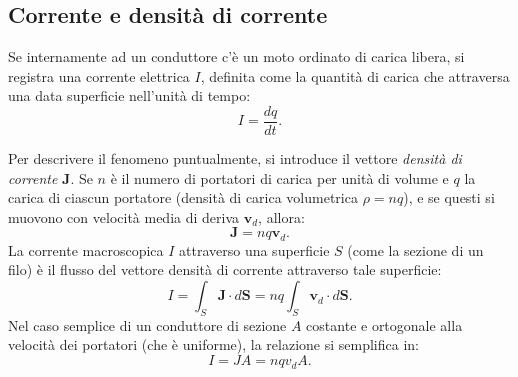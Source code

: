 \documentclass[a4paper,11pt]{report}
\begin{document}
\subsection{Corrente e densità di corrente}
Se internamente ad un conduttore c'è un moto ordinato di carica libera, si registra una corrente elettrica $I$, definita come la quantità di carica che attraversa una data superficie nell'unità di tempo:
\begin{equation}
   I = \frac{dq}{dt}.
\end{equation}

Per descrivere il fenomeno puntualmente, si introduce il vettore \textit{densità di corrente} $\bm{J}$.
Se $n$ è il numero di portatori di carica per unità di volume e $q$ la carica di ciascun portatore (densità di carica volumetrica $\rho = nq$), e se questi si muovono con velocità media di deriva $\bm{v}_d$, allora:
\begin{equation}
   \bm{J} = n q \bm{v}_d.
   \label{eq:j}
\end{equation}
La corrente macroscopica $I$ attraverso una superficie $S$ (come la sezione di un filo) è il flusso del vettore densità di corrente attraverso tale superficie:
\begin{equation}
   I = \int_S \bm{J} \cdot d\bm{S} = nq\int_S \bm{v}_d \cdot d\bm{S}.
\end{equation}
Nel caso semplice di un conduttore di sezione $A$ costante e ortogonale alla velocità dei portatori (che è uniforme), la relazione si semplifica in:
\begin{equation}
   I = J A = n q v_d A.
   \label{eq:corrente}
\end{equation}
\end{document}
